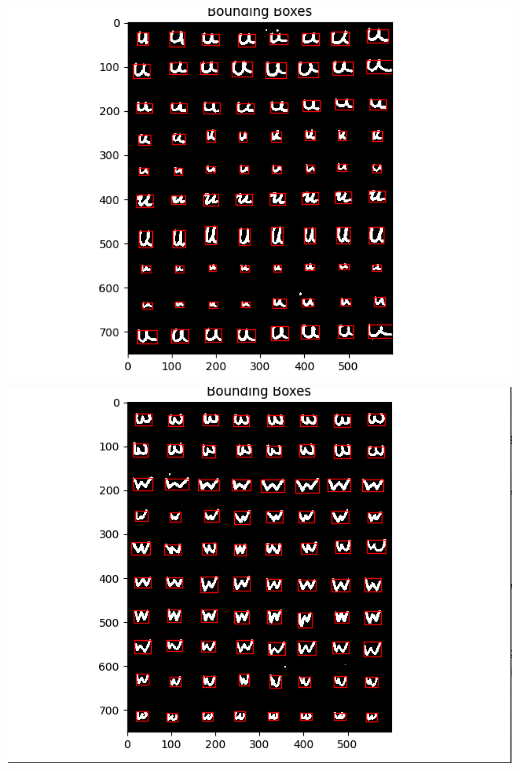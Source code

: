 \documentclass[12pt]{article}
\begin{document}
\includegraphics*[scale=0.5]{uBounds} \\
\includegraphics*[scale=0.5]{wBounds} \\
\end{document}
